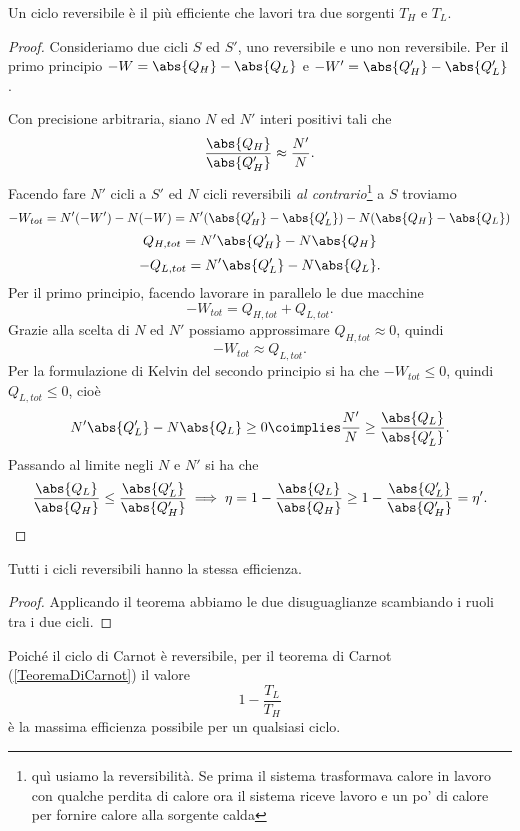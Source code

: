 \begin{theorem}[di Carnot]\label{TeoremaDiCarnot}
Un ciclo reversibile \`e il pi\`u efficiente che lavori tra due sorgenti $T_H$ e $T_L$.
\end{theorem}
\begin{proof}
Consideriamo due cicli $S$ ed $S'$, uno reversibile e uno non reversibile. Per il primo principio $-W=\abs{Q_H}-\abs{Q_L}$ e $-W'=\abs{Q_H'}-\abs{Q_L'}$.

Con precisione arbitraria, siano $N$ ed $N'$ interi positivi tali che
\[\frac{\abs{Q_H}}{\abs{Q_H'}}\approx \frac{N'}{N}.\]
Facendo fare $N'$ cicli a $S'$ ed $N$ cicli reversibili \textit{al contrario}\footnote{qu\`i usiamo la reversibilit\`a. Se prima il sistema trasformava calore in lavoro con qualche perdita di calore ora il sistema riceve lavoro e un po' di calore per fornire calore alla sorgente calda} a $S$ troviamo
\[-W_{tot}=N'(-W')-N(-W)=N'(\abs{Q_H'}-\abs{Q_L'})-N(\abs{Q_H}-\abs{Q_L})\]
\[Q_{H,tot}=N'\abs{Q_H'}-N\abs{Q_H}\]
\[-Q_{L,tot}=N'\abs{Q_L'}-N\abs{Q_L}.\]
Per il primo principio, facendo lavorare in parallelo le due macchine
\[-W_{tot}=Q_{H,tot}+Q_{L,tot}.\]
Grazie alla scelta di $N$ ed $N'$ possiamo approssimare $Q_{H,tot}\approx 0$, quindi
\[-W_{tot}\approx Q_{L,tot}.\]
Per la formulazione di Kelvin del secondo principio si ha che $-W_{tot}\leq0$, quindi $Q_{L,tot}\leq 0$, cio\`e
\[N'\abs{Q_L'}-N\abs{Q_L}\geq 0\coimplies \frac{N'}N\geq \frac{\abs{Q_L}}{\abs{Q_L'}}.\]
Passando al limite negli $N$ e $N'$ si ha che
\[\frac{\abs{Q_L}}{\abs{Q_H}}\leq \frac{\abs{Q_L'}}{\abs{Q_H'}}\implies \eta=1-\frac{\abs{Q_L}}{\abs{Q_H}}\geq 1-\frac{\abs{Q_L'}}{\abs{Q_H'}}=\eta'.\]
\end{proof}

\begin{corollary}\label{CicliReversibiliHannoLaStessaEfficienza}
Tutti i cicli reversibili hanno la stessa efficienza.
\end{corollary}
\begin{proof}
Applicando il teorema abbiamo le due disuguaglianze scambiando i ruoli tra i due cicli.
\end{proof}

\begin{remark}
Poich\'e il ciclo di Carnot \`e reversibile, per il teorema di Carnot (\ref{TeoremaDiCarnot}) il valore
\[1-\frac{T_L}{T_H}\]
\`e la massima efficienza possibile per un qualsiasi ciclo.
\end{remark}


